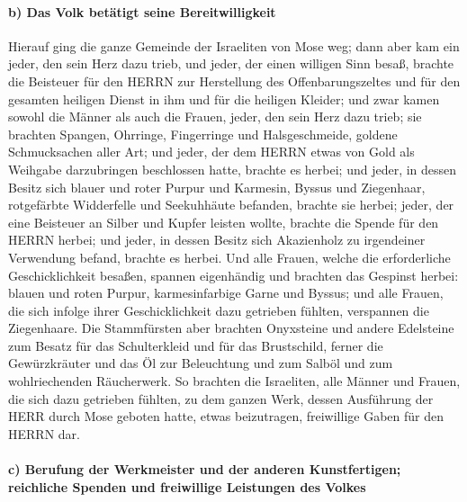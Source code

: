 \hypertarget{b-das-volk-betuxe4tigt-seine-bereitwilligkeit}{%
\paragraph{b) Das Volk betätigt seine
Bereitwilligkeit}\label{b-das-volk-betuxe4tigt-seine-bereitwilligkeit}}

 Hierauf ging die ganze Gemeinde der Israeliten von Mose
weg;  dann aber kam ein jeder, den sein Herz dazu trieb,
und jeder, der einen willigen Sinn besaß, brachte die Beisteuer für den
HERRN zur Herstellung des Offenbarungszeltes und für den gesamten
heiligen Dienst in ihm und für die heiligen Kleider;  und
zwar kamen sowohl die Männer als auch die Frauen, jeder, den sein Herz
dazu trieb; sie brachten Spangen, Ohrringe, Fingerringe und
Halsgeschmeide, goldene Schmucksachen aller Art; und jeder, der dem
HERRN etwas von Gold als Weihgabe darzubringen beschlossen hatte,
brachte es herbei;  und jeder, in dessen Besitz sich
blauer und roter Purpur und Karmesin, Byssus und Ziegenhaar, rotgefärbte
Widderfelle und Seekuhhäute befanden, brachte sie herbei;
 jeder, der eine Beisteuer an Silber und Kupfer leisten
wollte, brachte die Spende für den HERRN herbei; und jeder, in dessen
Besitz sich Akazienholz zu irgendeiner Verwendung befand, brachte es
herbei.  Und alle Frauen, welche die erforderliche
Geschicklichkeit besaßen, spannen eigenhändig und brachten das Gespinst
herbei: blauen und roten Purpur, karmesinfarbige Garne und Byssus;
 und alle Frauen, die sich infolge ihrer Geschicklichkeit
dazu getrieben fühlten, verspannen die Ziegenhaare.  Die
Stammfürsten aber brachten Onyxsteine und andere Edelsteine zum Besatz
für das Schulterkleid und für das Brustschild,  ferner
die Gewürzkräuter und das Öl zur Beleuchtung und zum Salböl und zum
wohlriechenden Räucherwerk.  So brachten die Israeliten,
alle Männer und Frauen, die sich dazu getrieben fühlten, zu dem ganzen
Werk, dessen Ausführung der HERR durch Mose geboten hatte, etwas
beizutragen, freiwillige Gaben für den HERRN dar.

\hypertarget{c-berufung-der-werkmeister-und-der-anderen-kunstfertigen-reichliche-spenden-und-freiwillige-leistungen-des-volkes}{%
\paragraph{c) Berufung der Werkmeister und der anderen Kunstfertigen;
reichliche Spenden und freiwillige Leistungen des
Volkes}\label{c-berufung-der-werkmeister-und-der-anderen-kunstfertigen-reichliche-spenden-und-freiwillige-leistungen-des-volkes}}

